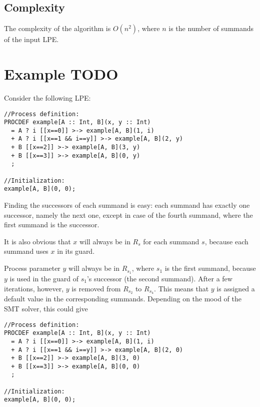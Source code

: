 \subsection{Complexity}

The complexity of the algorithm is $O(n^2)$, where $n$ is the number of summands of the input LPE.

\section{Example TODO}

Consider the following LPE:

\begin{lstlisting}
//Process definition:
PROCDEF example[A :: Int, B](x, y :: Int)
  = A ? i [[x==0]] >-> example[A, B](1, i)
  + A ? i [[x==1 && i==y]] >-> example[A, B](2, y)
  + B [[x==2]] >-> example[A, B](3, y)
  + B [[x==3]] >-> example[A, B](0, y)
  ;

//Initialization:
example[A, B](0, 0);
\end{lstlisting}

Finding the successors of each summand is easy: each summand has exactly one successor, namely the next one, except in case of the fourth summand, where the first summand is the successor.

It is also obvious that $x$ will always be in $R_s$ for each summand $s$, because each summand uses $x$ in its guard.

Process parameter $y$ will always be in $R_{s_1}$, where $s_1$ is the first summand, because $y$ is used in the guard of $s_1$'s successor (the second summand).
After a few iterations, however, $y$ is removed from $R_{s_2}$ to $R_{s_4}$.
This means that $y$ is assigned a default value in the corresponding summands.
Depending on the mood of the SMT solver, this could give

\begin{lstlisting}
//Process definition:
PROCDEF example[A :: Int, B](x, y :: Int)
  = A ? i [[x==0]] >-> example[A, B](1, i)
  + A ? i [[x==1 && i==y]] >-> example[A, B](2, 0)
  + B [[x==2]] >-> example[A, B](3, 0)
  + B [[x==3]] >-> example[A, B](0, 0)
  ;

//Initialization:
example[A, B](0, 0);
\end{lstlisting}




